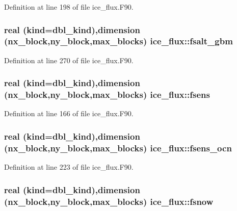 Definition at line 198 of file ice\_\-flux.F90.\hypertarget{namespaceice__flux_ac48af307927403704bd7ad20cb0d54b3}{
\subsubsection[{fsalt\_\-gbm}]{\setlength{\rightskip}{0pt plus 5cm}real (kind=dbl\_\-kind),dimension (nx\_\-block,ny\_\-block,max\_\-blocks) {\bf ice\_\-flux::fsalt\_\-gbm}}}
\label{namespaceice__flux_ac48af307927403704bd7ad20cb0d54b3}


Definition at line 270 of file ice\_\-flux.F90.\hypertarget{namespaceice__flux_ad76df6df986573fcb622fb418d960f37}{
\subsubsection[{fsens}]{\setlength{\rightskip}{0pt plus 5cm}real (kind=dbl\_\-kind),dimension (nx\_\-block,ny\_\-block,max\_\-blocks) {\bf ice\_\-flux::fsens}}}
\label{namespaceice__flux_ad76df6df986573fcb622fb418d960f37}


Definition at line 166 of file ice\_\-flux.F90.\hypertarget{namespaceice__flux_aa2a8953e1c37a1f09551ac626a62263b}{
\subsubsection[{fsens\_\-ocn}]{\setlength{\rightskip}{0pt plus 5cm}real (kind=dbl\_\-kind),dimension (nx\_\-block,ny\_\-block,max\_\-blocks) {\bf ice\_\-flux::fsens\_\-ocn}}}
\label{namespaceice__flux_aa2a8953e1c37a1f09551ac626a62263b}


Definition at line 223 of file ice\_\-flux.F90.\hypertarget{namespaceice__flux_ada95784733af0019d97dc30baf7511b4}{
\subsubsection[{fsnow}]{\setlength{\rightskip}{0pt plus 5cm}real (kind=dbl\_\-kind),dimension (nx\_\-block,ny\_\-block,max\_\-blocks) {\bf ice\_\-flux::fsnow}}}
\label{namespaceice__flux_ada95784733af0019d97dc30baf7511b4}


